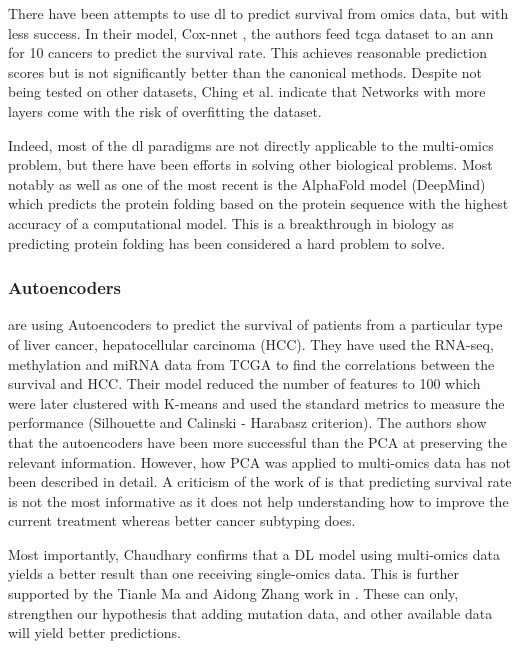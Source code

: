 There have been attempts to use \acrshort{dl} to predict survival from omics data, but with less success. In their model, Cox-nnet \cite{Ching2018-gq}, the authors feed \acrshort{tcga} dataset to an \acrshort{ann} for 10 cancers to predict the survival rate. This achieves reasonable prediction scores but is not significantly better than the canonical methods. Despite not being tested on other datasets, Ching et al. indicate that Networks with more layers come with the risk of overfitting the dataset.  


Indeed, most of the \acrshort{dl} paradigms are not directly applicable to the multi-omics problem, but there have been efforts in solving other biological problems. Most notably as well as one of the most recent is the AlphaFold model\cite{Jumper2021-du} (DeepMind) which predicts the protein folding based on the protein sequence with the highest accuracy of a computational model. This is a breakthrough in biology as predicting protein folding has been considered a hard problem to solve.


\subsubsection{Autoencoders} \label{s:autoencoders}

\citet{Chaudhary2018-qj} are using Autoencoders to predict the survival of patients from a particular type of liver cancer, hepatocellular carcinoma (HCC). They have used the RNA-seq, methylation and miRNA data from TCGA to find the correlations between the survival and HCC. Their model reduced the number of features to 100 which were later clustered with K-means and used the standard metrics to measure the performance (Silhouette and Calinski - Harabasz criterion). The authors show that the autoencoders have been more successful than the PCA at preserving the relevant information. However, how PCA was applied to multi-omics data has not been described in detail. A criticism of the work of \citet{Chaudhary2018-qj} is that predicting survival rate is not the most informative as it does not help understanding how to improve the current treatment whereas better cancer subtyping does.

Most importantly, Chaudhary confirms that a DL model using multi-omics data yields a better result than one receiving single-omics data. This is further supported by the Tianle Ma and Aidong Zhang work in \cite{Ma2019-hk}. These can only, strengthen our hypothesis that adding mutation data, and other available data will yield better predictions.

